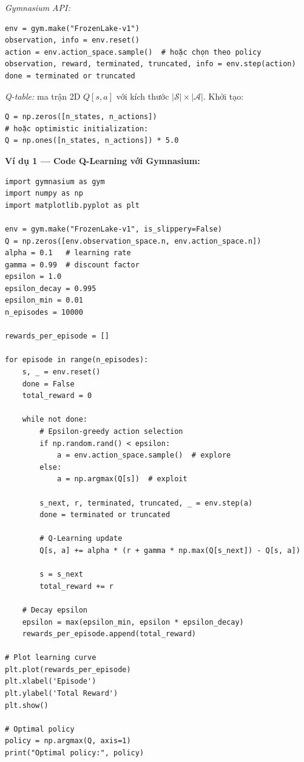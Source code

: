 \documentclass[12pt,a4paper]{article}
\begin{document}
\textit{Gymnasium API:}
\begin{verbatim}
env = gym.make("FrozenLake-v1")
observation, info = env.reset()
action = env.action_space.sample()  # hoặc chọn theo policy
observation, reward, terminated, truncated, info = env.step(action)
done = terminated or truncated
\end{verbatim}

\textit{Q-table:} ma trận 2D $Q[s, a]$ với kích thước $|\mathcal{S}| \times |\mathcal{A}|$. Khởi tạo:
\begin{verbatim}
Q = np.zeros([n_states, n_actions])
# hoặc optimistic initialization:
Q = np.ones([n_states, n_actions]) * 5.0
\end{verbatim}

\textbf{Ví dụ 1 --- Code Q-Learning với Gymnasium:}

\begin{verbatim}
import gymnasium as gym
import numpy as np
import matplotlib.pyplot as plt

env = gym.make("FrozenLake-v1", is_slippery=False)
Q = np.zeros([env.observation_space.n, env.action_space.n])
alpha = 0.1   # learning rate
gamma = 0.99  # discount factor
epsilon = 1.0
epsilon_decay = 0.995
epsilon_min = 0.01
n_episodes = 10000

rewards_per_episode = []

for episode in range(n_episodes):
    s, _ = env.reset()
    done = False
    total_reward = 0

    while not done:
        # Epsilon-greedy action selection
        if np.random.rand() < epsilon:
            a = env.action_space.sample()  # explore
        else:
            a = np.argmax(Q[s])  # exploit

        s_next, r, terminated, truncated, _ = env.step(a)
        done = terminated or truncated

        # Q-Learning update
        Q[s, a] += alpha * (r + gamma * np.max(Q[s_next]) - Q[s, a])

        s = s_next
        total_reward += r

    # Decay epsilon
    epsilon = max(epsilon_min, epsilon * epsilon_decay)
    rewards_per_episode.append(total_reward)

# Plot learning curve
plt.plot(rewards_per_episode)
plt.xlabel('Episode')
plt.ylabel('Total Reward')
plt.show()

# Optimal policy
policy = np.argmax(Q, axis=1)
print("Optimal policy:", policy)
\end{verbatim}
\end{document}
